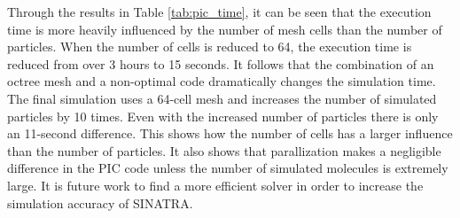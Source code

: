 \indent Through the results in Table \ref{tab:pic_time}, it can be seen that the execution time is more heavily influenced by the number of mesh cells than the number of particles. When the number of cells is reduced to 64, the execution time is reduced from over 3 hours to 15 seconds. It follows that the combination of an octree mesh and a non-optimal code dramatically changes the simulation time. The final simulation uses a 64-cell mesh and increases the number of simulated particles by 10 times. Even with the increased number of particles there is only an 11-second difference. This shows how the number of cells has a larger influence than the number of particles. It also shows that parallization makes a negligible difference in the PIC code unless the number of simulated molecules is extremely large. It is future work to find a more efficient solver in order to increase the simulation accuracy of SINATRA. 
